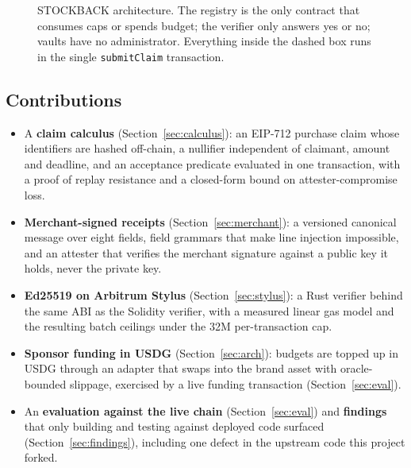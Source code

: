 \documentclass[10.5pt,letterpaper]{article}
\theoremstyle{definition}
\theoremstyle{remark}
\newcommand{\ttt}[1]{\texttt{#1}}
\begin{document}
\begin{figure}[t]
\caption{STOCKBACK architecture. The registry is the only contract that consumes caps or spends budget; the verifier
only answers yes or no; vaults have no administrator. Everything inside the dashed box runs in the single
\ttt{submitClaim} transaction.}
\label{fig:arch}
\end{figure}

\subsection{Contributions}
\begin{itemize}
  \item A \textbf{claim calculus} (Section~\ref{sec:calculus}): an EIP-712 purchase claim whose identifiers are hashed off-chain,
        a nullifier independent of claimant, amount and deadline, and an acceptance predicate evaluated in one
        transaction, with a proof of replay resistance and a closed-form bound on attester-compromise loss.
  \item \textbf{Merchant-signed receipts} (Section~\ref{sec:merchant}): a versioned canonical message over eight fields, field grammars
        that make line injection impossible, and an attester that verifies the merchant signature against a public
        key it holds, never the private key.
  \item \textbf{Ed25519 on Arbitrum Stylus} (Section~\ref{sec:stylus}): a Rust verifier behind the same ABI as the Solidity verifier,
        with a measured linear gas model and the resulting batch ceilings under the 32M per-transaction cap.
  \item \textbf{Sponsor funding in USDG} (Section~\ref{sec:arch}): budgets are topped up in USDG through an adapter that swaps
        into the brand asset with oracle-bounded slippage, exercised by a live funding transaction (Section~\ref{sec:eval}).
  \item An \textbf{evaluation against the live chain} (Section~\ref{sec:eval}) and \textbf{findings} that only building and testing
        against deployed code surfaced (Section~\ref{sec:findings}), including one defect in the upstream code this project forked.
\end{itemize}
\end{document}
